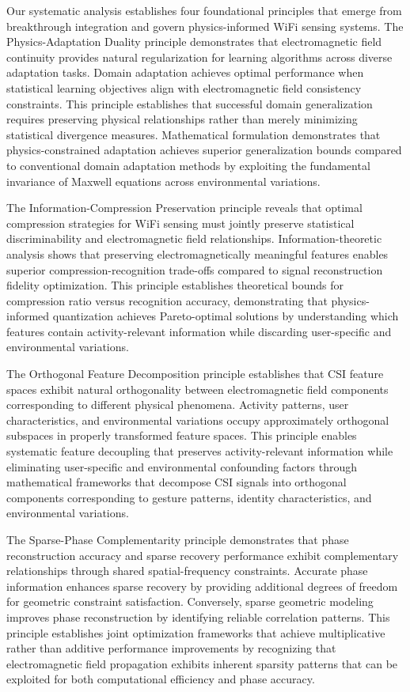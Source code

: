\documentclass[journal]{IEEEtran}
\begin{document}
Our systematic analysis establishes four foundational principles that emerge from breakthrough integration and govern physics-informed WiFi sensing systems. The Physics-Adaptation Duality principle demonstrates that electromagnetic field continuity provides natural regularization for learning algorithms across diverse adaptation tasks. Domain adaptation achieves optimal performance when statistical learning objectives align with electromagnetic field consistency constraints. This principle establishes that successful domain generalization requires preserving physical relationships rather than merely minimizing statistical divergence measures. Mathematical formulation demonstrates that physics-constrained adaptation achieves superior generalization bounds compared to conventional domain adaptation methods by exploiting the fundamental invariance of Maxwell equations across environmental variations.

The Information-Compression Preservation principle reveals that optimal compression strategies for WiFi sensing must jointly preserve statistical discriminability and electromagnetic field relationships. Information-theoretic analysis shows that preserving electromagnetically meaningful features enables superior compression-recognition trade-offs compared to signal reconstruction fidelity optimization. This principle establishes theoretical bounds for compression ratio versus recognition accuracy, demonstrating that physics-informed quantization achieves Pareto-optimal solutions by understanding which features contain activity-relevant information while discarding user-specific and environmental variations.

The Orthogonal Feature Decomposition principle establishes that CSI feature spaces exhibit natural orthogonality between electromagnetic field components corresponding to different physical phenomena. Activity patterns, user characteristics, and environmental variations occupy approximately orthogonal subspaces in properly transformed feature spaces. This principle enables systematic feature decoupling that preserves activity-relevant information while eliminating user-specific and environmental confounding factors through mathematical frameworks that decompose CSI signals into orthogonal components corresponding to gesture patterns, identity characteristics, and environmental variations.

The Sparse-Phase Complementarity principle demonstrates that phase reconstruction accuracy and sparse recovery performance exhibit complementary relationships through shared spatial-frequency constraints. Accurate phase information enhances sparse recovery by providing additional degrees of freedom for geometric constraint satisfaction. Conversely, sparse geometric modeling improves phase reconstruction by identifying reliable correlation patterns. This principle establishes joint optimization frameworks that achieve multiplicative rather than additive performance improvements by recognizing that electromagnetic field propagation exhibits inherent sparsity patterns that can be exploited for both computational efficiency and phase accuracy.
\end{document}
